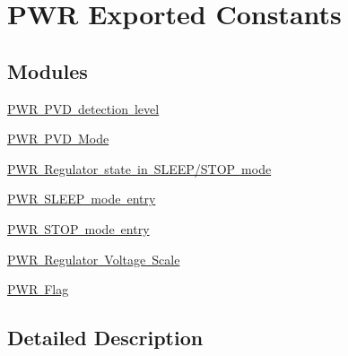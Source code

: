 \hypertarget{group___p_w_r___exported___constants}{}\section{P\+WR Exported Constants}
\label{group___p_w_r___exported___constants}
\subsection*{Modules}
\begin{DoxyCompactItemize}
\item 
\mbox{\hyperlink{group___p_w_r___p_v_d__detection__level}{P\+W\+R P\+V\+D detection level}}
\item 
\mbox{\hyperlink{group___p_w_r___p_v_d___mode}{P\+W\+R P\+V\+D Mode}}
\item 
\mbox{\hyperlink{group___p_w_r___regulator__state__in___s_t_o_p__mode}{P\+W\+R Regulator state in S\+L\+E\+E\+P/\+S\+T\+O\+P mode}}
\item 
\mbox{\hyperlink{group___p_w_r___s_l_e_e_p__mode__entry}{P\+W\+R S\+L\+E\+E\+P mode entry}}
\item 
\mbox{\hyperlink{group___p_w_r___s_t_o_p__mode__entry}{P\+W\+R S\+T\+O\+P mode entry}}
\item 
\mbox{\hyperlink{group___p_w_r___regulator___voltage___scale}{P\+W\+R Regulator Voltage Scale}}
\item 
\mbox{\hyperlink{group___p_w_r___flag}{P\+W\+R Flag}}
\end{DoxyCompactItemize}


\subsection{Detailed Description}
